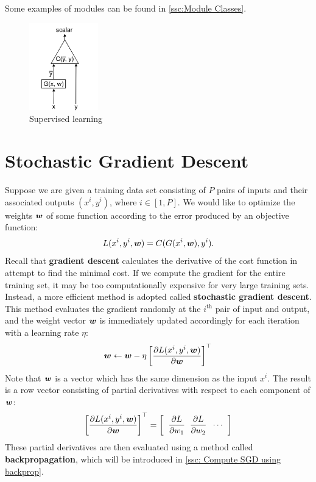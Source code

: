 Some examples of modules can be found in \cref{ssc:Module Classes}. 

\begin{figure}[ht]
\centering
\includegraphics[width=30mm]{lectures/01-b/supervised.png}
\caption{Supervised learning}
\label{fig:supervised}
\end{figure}

\section{Stochastic Gradient Descent}\label{sec: SGD}

Suppose we are given a training data set consisting of $P$ pairs of inputs and their associated outputs $(x^i, y^i)$, where $i \in [1, P]$.
We would like to optimize the weights $\bm{w}$ of some function according to the error produced by an objective function:
\[
L(x^i, y^i, \bm{w}) = C(G(x^i, \bm{w}), y^i).
\]
Recall that \textbf{gradient descent} calculates the derivative of the cost function in attempt to find the minimal cost.
If we compute the gradient for the entire training set, it may be too computationally expensive for very large training sets.
Instead, a more efficient method is adopted called \textbf{stochastic gradient descent}.
This method evaluates the gradient randomly at the $i^\text{th}$ pair of input and output, and the weight vector $\bm{w}$ is immediately updated accordingly for each iteration with a learning rate $\eta$:
\begin{equation}\label{eq: SGD}
\bm{w} \leftarrow \bm{w} - \eta \left[ \frac{\partial L(x^i, y^i, \bm{w})}{\partial \bm{w}} \right]^\top
\end{equation}
Note that $\bm{w}$ is a vector which has the same dimension as the input $x^{i}$.
The result is a row vector consisting of partial derivatives with respect to each component of $\bm{w}$:
\[
\left[ \frac{\partial L(x^i, y^i, \bm{w})}{\partial \bm{w}} \right]^\top = \left[ \hspace{2mm} \frac{\partial L}{\partial w_1} \hspace{2mm} \frac{\partial L}{\partial w_2} \hspace{2mm} \cdots \hspace{2mm} \right]
\]
These partial derivatives are then evaluated using a method called \textbf{backpropagation}, which will be introduced in \cref{ssc: Compute SGD using backprop}.

